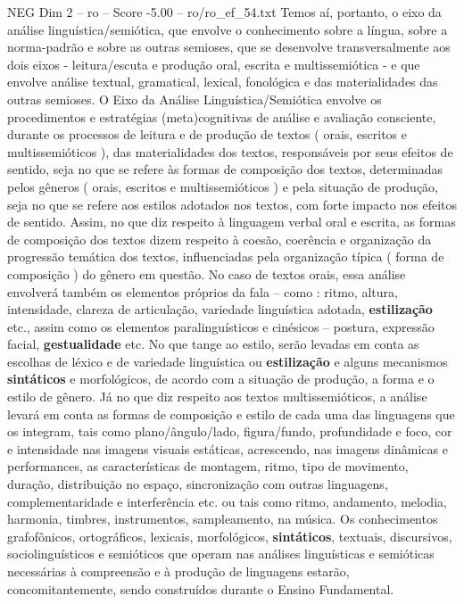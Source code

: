 \begin{textsample}{NEG Dim 2 – ro – Score -5.00 – ro/ro\_ef\_54.txt}
Temos aí, portanto, o eixo da análise linguística/semiótica, que envolve o conhecimento sobre a língua, sobre a norma-padrão e sobre as outras semioses, que se desenvolve transversalmente aos dois eixos - leitura/escuta e produção oral, escrita e multissemiótica - e que envolve análise textual, gramatical, lexical, fonológica e das materialidades das outras semioses.
O Eixo da Análise Linguística/Semiótica envolve os procedimentos e estratégias (meta)cognitivas de análise e avaliação consciente, durante os processos de leitura e de produção de textos ( orais, escritos e multissemióticos ), das materialidades dos textos, responsáveis por seus efeitos de sentido, seja no que se refere às formas de composição dos textos, determinadas pelos gêneros ( orais, escritos e multissemióticos ) e pela situação de produção, seja no que se refere aos estilos adotados nos textos, com forte impacto nos efeitos de sentido.
Assim, no que diz respeito à linguagem verbal oral e escrita, as formas de composição dos textos dizem respeito à coesão, coerência e organização da progressão temática dos textos, influenciadas pela organização típica ( forma de composição ) do gênero em questão.
No caso de textos orais, essa análise envolverá também os elementos próprios da fala – como : ritmo, altura, intensidade, clareza de articulação, variedade linguística adotada, \textbf{estilização} etc., assim como os elementos paralinguísticos e cinésicos – postura, expressão facial, \textbf{gestualidade} etc.
No que tange ao estilo, serão levadas em conta as escolhas de léxico e de variedade linguística ou \textbf{estilização} e alguns mecanismos \textbf{sintáticos} e morfológicos, de acordo com a situação de produção, a forma e o estilo de gênero.
Já no que diz respeito aos textos multissemióticos, a análise levará em conta as formas de composição e estilo de cada uma das linguagens que os integram, tais como plano/ângulo/lado, figura/fundo, profundidade e foco, cor e intensidade nas imagens visuais estáticas, acrescendo, nas imagens dinâmicas e performances, as características de montagem, ritmo, tipo de movimento, duração, distribuição no espaço, sincronização com outras linguagens, complementaridade e interferência etc. ou tais como ritmo, andamento, melodia, harmonia, timbres, instrumentos, sampleamento, na música.
Os conhecimentos grafofônicos, ortográficos, lexicais, morfológicos, \textbf{sintáticos}, textuais, discursivos, sociolinguísticos e semióticos que operam nas análises linguísticas e semióticas necessárias à compreensão e à produção de linguagens estarão, concomitantemente, sendo construídos durante o Ensino Fundamental.

\end{textsample}
